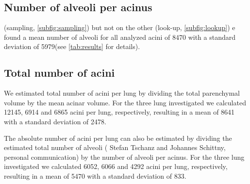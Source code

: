 \documentclass[final,paper=a4,DIV=calc,abstract,english]{scrartcl}
\newcommand{\totalnumberofaciniB}{12145\xspace}
\newcommand{\totalnumberofaciniD}{6914\xspace}
\newcommand{\totalnumberofaciniE}{6865\xspace}
\newcommand{\meantotalnumberofacini}{8641\xspace}
\newcommand{\meantotalnumberofaciniSTD}{2478\xspace} %
\newcommand{\totalnumberofaciniBVariant}{6052\xspace}
\newcommand{\totalnumberofaciniDVariant}{6066\xspace}
\newcommand{\totalnumberofaciniEVariant}{4292\xspace}
\newcommand{\meantotalnumberofaciniVariant}{5470\xspace}
\newcommand{\meantotalnumberofaciniSTDVariant}{833\xspace} %
\newcommand{\meannumberofalveoli}{8470\xspace} %
\newcommand{\meannumberofalveoliSTD}{5979\xspace}
\begin{document}
\subsection{Number of alveoli per acinus}
 (sampling, \autoref{subfig:sampling}) but not on the other  (look-up, \autoref{subfig:lookup}) e found a mean number of alveoli for all analyzed acini of \meannumberofalveoli with a standard deviation of \meannumberofalveoliSTD (see \autoref{tab:results} for details).

\subsection{Total number of acini}\label{sec:results:total number of acini}
We estimated  total number of acini per lung by dividing the total parenchymal volume by the mean acinar volume.
For the three lung investigated we calculated \totalnumberofaciniB, \totalnumberofaciniD and \totalnumberofaciniE acini per lung, respectively, resulting in a mean of \meantotalnumberofacini with a standard deviation of \meantotalnumberofaciniSTD.

The absolute number of acini per lung can also be estimated by dividing the estimated total number of alveoli  ( Stefan Tschanz and Johannes Schittny, personal communication) by the number of alveoli per acinus.
For the three lung investigated we calculated \totalnumberofaciniBVariant, \totalnumberofaciniDVariant and \totalnumberofaciniEVariant acini per lung, respectively, resulting in a mean of \meantotalnumberofaciniVariant with a standard deviation of \meantotalnumberofaciniSTDVariant.
\end{document}
